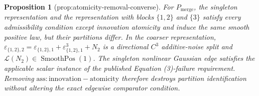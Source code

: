 \documentclass{article}
\newtheorem{proposition}{Proposition}
\begin{document}
\begin{proposition}[prop:atomicity-removal-converse]\label{prop:atomicity-removal-converse}
For \(P_{\mathrm{merge}}\), the singleton representation and the representation with blocks \(\{1,2\}\) and \(\{3\}\) satisfy every admissibility condition except innovation atomicity and induce the same smooth positive law, but their partitions differ. In the coarser representation, \(\varepsilon_{\{1,2\},2}=\varepsilon_{\{1,2\},1}+\varepsilon_{\{1,2\},1}^3+N_2\) is a directional \(C^3\) additive-noise split and \(\mathcal L(N_2)\in\operatorname{SmoothPos}(1)\). The singleton nonlinear Gaussian edge satisfies the applicable scalar instance of the published Equation (3)-failure requirement. Removing \(\mathrm{ass:innovation-atomicity}\) therefore destroys partition identification without altering the exact edgewise comparator condition.
\end{proposition}
\end{document}
